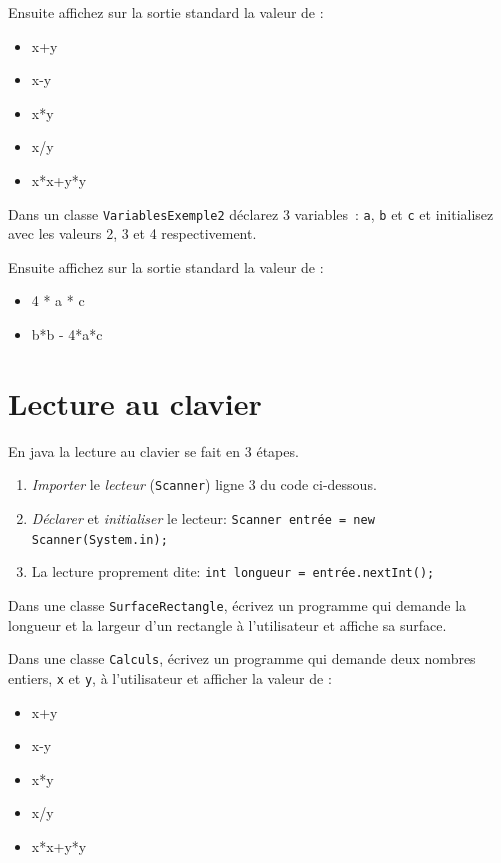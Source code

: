 \documentclass[a4paper,11pt]{article}
\begin{document}
		Ensuite affichez sur la sortie standard la valeur de :
		\begin{itemize}
		 	\item x+y
			\item x-y
			\item x*y
			\item x/y
			\item x*x+y*y
		\end{itemize} 


	\Exercice{} 
		Dans un classe \texttt{VariablesExemple2} déclarez 3 variables~: 
		\texttt{a}, \texttt{b} et \texttt{c} et initialisez avec les valeurs 2, 3 et 4 respectivement.
		
		Ensuite affichez sur la sortie standard la valeur de :
		\begin{itemize}
		 	\item 4 * a * c
			\item b*b - 4*a*c
		\end{itemize} 
	

\section{Lecture au clavier}


	En java la lecture au clavier se fait en 3 étapes.

	\begin{enumerate}
		\item \emph{Importer} le \emph{lecteur} (\texttt{Scanner}) ligne 3 du code ci-dessous.
		\item \emph{Déclarer} et \emph{initialiser} le lecteur:  \texttt{Scanner entrée = new Scanner(System.in);}
		\item La lecture proprement dite: \texttt{int longueur = entrée.nextInt();}
	\end{enumerate}


	\hspeparator


		Dans une classe \texttt{SurfaceRectangle}, écrivez un programme qui demande 
		la longueur et la largeur d'un rectangle à l'utilisateur et affiche sa surface.


	\Exercice{} 
		Dans une classe \texttt{Calculs}, écrivez un programme qui demande 
		deux nombres entiers, \texttt{x} et \texttt{y}, à l'utilisateur et afficher la valeur de :
		\begin{itemize}
		 	\item x+y
			\item x-y
			\item x*y
			\item x/y
			\item x*x+y*y
		\end{itemize} 
\end{document}
